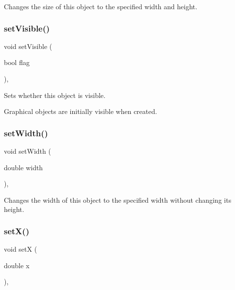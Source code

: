 Changes the size of this object to the specified width and height. 

\mbox{\label{classsgl_1_1GObject_a88203f28224315d9f4471212f4af8ed3}} 
\subsubsection{\texorpdfstring{set\+Visible()}{setVisible()}}
{\footnotesize\ttfamily void set\+Visible (\begin{DoxyParamCaption}\item[{bool}]{flag }\end{DoxyParamCaption})\hspace{0.3cm}{\ttfamily [virtual]}, {\ttfamily [inherited]}}



Sets whether this object is visible. 

Graphical objects are initially visible when created. \mbox{\label{classsgl_1_1GObject_aa3f3fba4cb131baa8696ba01e3bceca1}} 
\subsubsection{\texorpdfstring{set\+Width()}{setWidth()}}
{\footnotesize\ttfamily void set\+Width (\begin{DoxyParamCaption}\item[{double}]{width }\end{DoxyParamCaption})\hspace{0.3cm}{\ttfamily [virtual]}, {\ttfamily [inherited]}}



Changes the width of this object to the specified width without changing its height. 

\mbox{\label{classsgl_1_1GObject_a9c18fcc579333bf9653d13ad2b372e39}} 
\subsubsection{\texorpdfstring{set\+X()}{setX()}}
{\footnotesize\ttfamily void setX (\begin{DoxyParamCaption}\item[{double}]{x }\end{DoxyParamCaption})\hspace{0.3cm}{\ttfamily [virtual]}, {\ttfamily [inherited]}}



